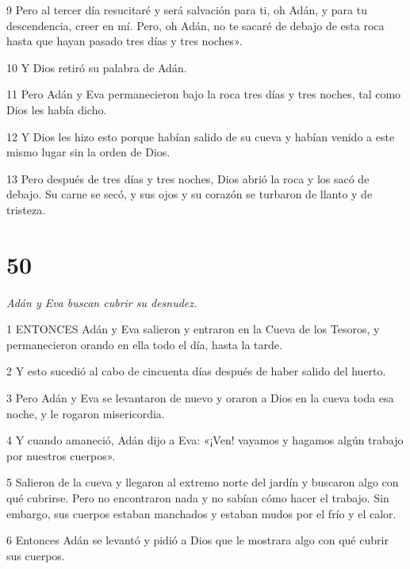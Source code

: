 \par 9 Pero al tercer día resucitaré y será salvación para ti, oh Adán, y para tu descendencia, creer en mí. Pero, oh Adán, no te sacaré de debajo de esta roca hasta que hayan pasado tres días y tres noches».

\par 10 Y Dios retiró su palabra de Adán.

\par 11 Pero Adán y Eva permanecieron bajo la roca tres días y tres noches, tal como Dios les había dicho.

\par 12 Y Dios les hizo esto porque habían salido de su cueva y habían venido a este mismo lugar sin la orden de Dios.

\par 13 Pero después de tres días y tres noches, Dios abrió la roca y los sacó de debajo. Su carne se secó, y sus ojos y su corazón se turbaron de llanto y de tristeza.

\chapter{50}

\par \textit{Adán y Eva buscan cubrir su desnudez.}

\par 1 ENTONCES Adán y Eva salieron y entraron en la Cueva de los Tesoros, y permanecieron orando en ella todo el día, hasta la tarde.

\par 2 Y esto sucedió al cabo de cincuenta días después de haber salido del huerto.

\par 3 Pero Adán y Eva se levantaron de nuevo y oraron a Dios en la cueva toda esa noche, y le rogaron misericordia.

\par 4 Y cuando amaneció, Adán dijo a Eva: «¡Ven! vayamos y hagamos algún trabajo por nuestros cuerpos».

\par 5 Salieron de la cueva y llegaron al extremo norte del jardín y buscaron algo con qué cubrirse. Pero no encontraron nada y no sabían cómo hacer el trabajo. Sin embargo, sus cuerpos estaban manchados y estaban mudos por el frío y el calor.

\par 6 Entonces Adán se levantó y pidió a Dios que le mostrara algo con qué cubrir sus cuerpos.

